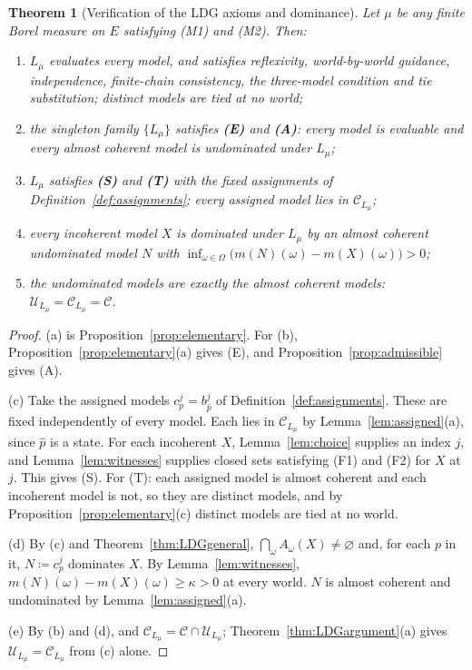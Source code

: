 \documentclass[11pt]{article}
\newtheorem{theorem}{Theorem}[section]
\theoremstyle{definition}
\newcommand{\C}{\mathcal C}
\newcommand{\U}{\mathcal U}
\newcommand{\Lmu}{L_\mu}
\begin{document}
\begin{theorem}[Verification of the LDG axioms and dominance]\label{thm:main}
Let $\mu$ be any finite Borel measure on $E$ satisfying (M1) and (M2). Then:
\begin{enumerate}[label=(\alph*)]
\item $\Lmu$ evaluates every model, and satisfies reflexivity, world-by-world guidance, independence, finite-chain consistency, the three-model condition and tie substitution; distinct models are tied at no world;
\item the singleton family $\{\Lmu\}$ satisfies \textbf{(E)} and \textbf{(A)}: every model is evaluable and every almost coherent model is undominated under $\Lmu$;
\item $\Lmu$ satisfies \textbf{{\color{red}(S)}} and \textbf{{\color{red}(T)}} with the fixed assignments of Definition~\ref{def:assignments}; every assigned model lies in $\C_{\Lmu}$;
\item every incoherent model $X$ is dominated under $\Lmu$ by an almost coherent undominated model $N$ with $\inf_{\omega\in\Omega}\bigl(m(N)(\omega)-m(X)(\omega)\bigr)>0$;
\item the undominated models are exactly the almost coherent models: $\U_{\Lmu}=\C_{\Lmu}=\C$.
\end{enumerate}
\end{theorem}
\begin{proof}
(a) is Proposition~\ref{prop:elementary}. For (b), Proposition~\ref{prop:elementary}(a) gives (E), and Proposition~\ref{prop:admissible} gives (A).

(c) {\color{red}Take the assigned models $c^j_p=b^j_{\hat p}$ of Definition~\ref{def:assignments}.} These are fixed independently of every model. Each lies in $\C_{\Lmu}$ by Lemma~\ref{lem:assigned}(a){\color{red}, since $\hat p$ is a state}. {\color{red}For each incoherent $X$, Lemma~\ref{lem:choice} supplies an index $j$, and Lemma~\ref{lem:witnesses} supplies closed sets satisfying (F1) and (F2) for $X$ at $j$. This gives (S). For (T): each assigned model is almost coherent and each incoherent model is not, so they are distinct models, and by Proposition~\ref{prop:elementary}(c) distinct models are tied at no world.}

(d) By (c) and Theorem~\ref{thm:LDGgeneral}, {\color{red}$\bigcap_\omega A_\omega(X)\ne\varnothing$ and, for each $p$ in it, $N\coloneqq c^j_p$ dominates $X$.} By Lemma~\ref{lem:witnesses}, $m(N)(\omega)-m(X)(\omega)\ge\kappa>0$ at every world. $N$ is almost coherent and undominated by Lemma~\ref{lem:assigned}(a).

(e) By (b) and (d), and $\C_{\Lmu}=\C\cap\U_{\Lmu}$; Theorem~\ref{thm:LDGargument}(a) gives $\U_{\Lmu}=\C_{\Lmu}$ from (c) alone.
\end{proof}
\end{document}
